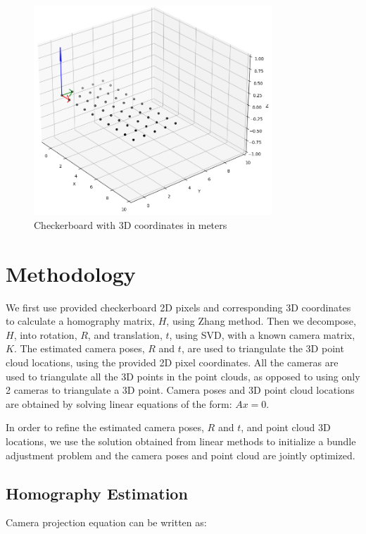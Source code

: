 \documentclass{article}
\begin{document}
\begin{figure}[h!]
    \centering
    \includegraphics[width=0.8\textwidth]{images/checkerboard.png}
    \caption{Checkerboard with 3D coordinates in meters}
    \label{fig:checkerboard}
\end{figure}




\section{Methodology}
We first use provided checkerboard 2D pixels and corresponding 3D coordinates to calculate a homography matrix, $H$, using Zhang method. Then we decompose, $H$, into rotation, $R$, and translation, $t$, using SVD,
with a known camera matrix, $K$. The estimated camera poses, $R$ and $t$, are used to triangulate the 3D point cloud locations, using the provided 2D pixel coordinates. All the cameras are used to triangulate all the 3D 
points in the point clouds, as opposed to using only 2 cameras to triangulate a 3D point. Camera poses and 3D point cloud locations are obtained by solving linear equations of the form: $Ax = 0$.

In order to refine the estimated camera poses, $R$ and $t$, and point cloud 3D locations, we use the solution obtained from linear methods to initialize a bundle adjustment problem and the camera poses and point cloud
are jointly optimized.

\pagebreak

\subsection{Homography Estimation}
Camera projection equation can be written as:
\end{document}
